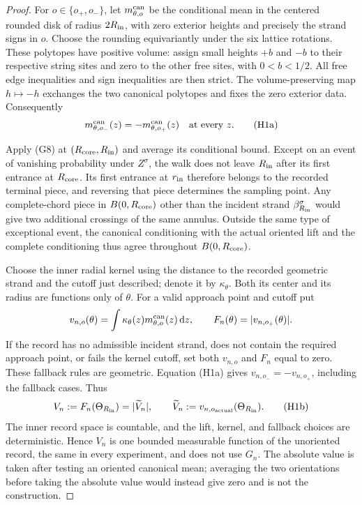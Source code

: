 \begin{proof}
For $o\in\{o_+,o_-\}$, let $m^{\rm can}_{\theta,o}$ be the conditional
mean in the centered rounded disk of radius $2R_{\rm in}$, with zero
exterior heights and precisely the strand signs in $o$. Choose the
rounding equivariantly under the six lattice rotations. These polytopes
have positive volume: assign small heights $+b$ and $-b$ to their
respective string sites and zero to the other free sites, with
$0<b<1/2$. All free edge inequalities and sign inequalities are then
strict. The volume-preserving map $h\mapsto-h$ exchanges the two
canonical polytopes and fixes the zero exterior data. Consequently
\[
 m^{\rm can}_{\theta,o_-}(z)=-m^{\rm can}_{\theta,o_+}(z)
 \quad\text{at every }z.                                      \tag{H1a}
\]

Apply (G8) at $(R_{\rm core},R_{\rm in})$ and average its conditional
bound. Except on an event of vanishing probability under $Z^\sigma$,
the walk does not leave $R_{\rm in}$ after its first entrance at
$R_{\rm core}$. Its first entrance at $r_{\rm in}$ therefore belongs
to the recorded terminal piece, and reversing that piece determines
the sampling point. Any complete-chord piece in $B(0,R_{\rm core})$
other than the incident strand $\beta_{R_{\rm in}}^\sigma$ would
give two additional crossings of the same annulus. Outside the same
type of exceptional event, the canonical conditioning with the
actual oriented lift and the complete conditioning thus agree
throughout $B(0,R_{\rm core})$.

Choose the inner radial kernel using the distance to the recorded
geometric strand and the cutoff just described; denote it by
$\kappa_\theta$. Both its center and its radius are functions only of
$\theta$. For a valid approach point and cutoff put
\[
 v_{n,o}(\theta)
   =\int\kappa_\theta(z)m^{\rm can}_{\theta,o}(z)\,\mathrm d z,
 \qquad
 F_n(\theta)=|v_{n,o_+}(\theta)|.
\]
If the record has no admissible incident strand, does not contain the
required approach point, or fails the kernel cutoff, set both
$v_{n,o}$ and $F_n$ equal to zero. These fallback rules are geometric.
Equation (H1a) gives $v_{n,o_-}=-v_{n,o_+}$, including the fallback
cases. Thus
\[
 V_n:=F_n(\Theta_{R_{\rm in}})
       =|\widetilde V_n|,
 \qquad
 \widetilde V_n:=v_{n,o_{\rm actual}}(\Theta_{R_{\rm in}}).
                                                        \tag{H1b}
\]
The inner record space is countable, and the lift, kernel, and fallback
choices are deterministic. Hence $V_n$ is one bounded measurable
function of the unoriented record, the same in every experiment, and
does not use $G_n$. The absolute value is taken after testing an oriented canonical
mean; averaging the two orientations before taking the absolute value
would instead give zero and is not the construction.


\end{proof}
